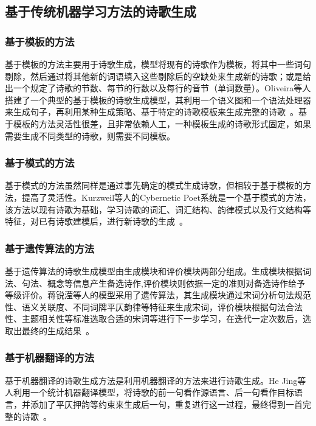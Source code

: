 \subsection{基于传统机器学习方法的诗歌生成}

\subsubsection{基于模板的方法}
基于模板的方法主要用于诗歌生成，模型将现有的诗歌作为模板，将其中一些词句剔除，然后通过将其他新的词语填入这些剔除后的空缺处来生成新的诗歌；或是给出一个规定了诗歌的节数、每节的行数以及每行的音节（单词数量）。Oliveira等人搭建了一个典型的基于模板的诗歌生成模型，其利用一个语义图和一个语法处理器来生成句子，再利用某种生成策略、基于特定的诗歌模板来生成完整的诗歌~\cite{oliveira2012poetryme}。基于模板的方法灵活性很差，且非常依赖人工，一种模板生成的诗歌形式固定，如果需要生成不同类型的诗歌，则需要不同模板。\par

\subsubsection{基于模式的方法}
基于模式的方法虽然同样是通过事先确定的模式生成诗歌，但相较于基于模板的方法，提高了灵活性。Kurzweil等人的Cybernetic Poet系统是一个基于模式的方法，该方法以现有诗歌为基础，学习诗歌的词汇、词汇结构、韵律模式以及行文结构等特征，对已有诗歌建模后，进行新诗歌的生成~\cite{kurzweil2001ray}。\par

\subsubsection{基于遗传算法的方法}
基于遗传算法的诗歌生成模型由生成模块和评价模块两部分组成。生成模块根据词法、句法、概念等信息产生备选诗作,评价模块则依据一定的准则对备选诗作给予等级评价。蒋锐滢等人的模型采用了遗传算法，其生成模块通过宋词分析句法规范性、语义关联度、不同词牌平仄韵律等特征来生成宋词，评价模块根据句法合法性、主题相关性等标准选取合适的宋词等进行下一步学习，在迭代一定次数后，选取出最终的生成结果~\cite{jiang2015jiyu}。\par

\subsubsection{基于机器翻译的方法}
基于机器翻译的诗歌生成方法是利用机器翻译的方法来进行诗歌生成。He Jing等人利用一个统计机器翻译模型，将诗歌的前一句看作源语言、后一句看作目标语言，并添加了平仄押韵等约束来生成后一句，重复进行这一过程，最终得到一首完整的诗歌~\cite{he2012generating}。\par

